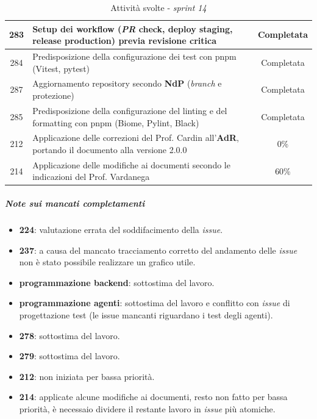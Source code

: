 \documentclass[12pt, a4paper]{article}
\begin{document}
{\begin{table}[H]
\begin{tabularx}{\textwidth}{|c|X|c|}
        283 & Setup dei workflow (\textit{PR} check, deploy staging, release production) previa revisione critica & Completata \\ \hline
        284 & Predisposizione della configurazione dei test con pnpm (Vitest, pytest) & Completata \\ \hline
        287 & Aggiornamento repository secondo \textbf{NdP} (\textit{branch} e protezione) & Completata \\ \hline
        285 & Predisposizione della configurazione del linting e del formatting con pnpm (Biome, Pylint, Black) & Completata \\ \hline
        212 & Applicazione delle correzioni del Prof. Cardin all'\textbf{AdR}, portando il documento alla versione 2.0.0 & 0\% \\ \hline
        214 & Applicazione delle modifiche ai documenti secondo le indicazioni del Prof. Vardanega & 60\% \\ \hline
    \end{tabularx}
    \caption{Attività svolte - \textit{sprint 14}}
\end{table}

\subparagraph{Note sui mancati completamenti}
\begin{itemize}
    \item \textbf{224}: valutazione errata del soddifacimento della \textit{issue}.
    \item \textbf{237}: a causa del mancato tracciamento corretto del andamento delle \textit{issue} non è stato possibile realizzare un grafico utile.
    \item \textbf{programmazione backend}: sottostima del lavoro.
    \item \textbf{programmazione agenti}: sottostima del lavoro e conflitto con \textit{issue} di progettazione test (le issue mancanti riguardano i test degli agenti).
    \item \textbf{278}: sottostima del lavoro.
    \item \textbf{279}: sottostima del lavoro.
    \item \textbf{212}: non iniziata per bassa priorità.
    \item \textbf{214}: applicate alcune modifiche ai documenti, resto non fatto per bassa priorità, è necessaio dividere il restante lavoro in \textit{issue} più atomiche.
\end{itemize}

}
\end{document}
